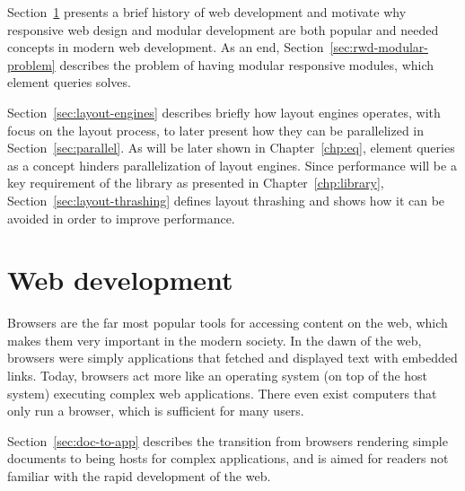 \documentclass[a4paper,11pt]{kth-mag}
\begin{document}
    Section~\ref{sec:web-dev} presents a brief history of web development and motivate why responsive web design and modular development are both popular and needed concepts in modern web development.
    As an end, Section~\ref{sec:rwd-modular-problem} describes the problem of having modular responsive modules, which element queries solves.
    
    Section~\ref{sec:layout-engines} describes briefly how layout engines operates, with focus on the layout process, to later present how they can be parallelized in Section~\ref{sec:parallel}.
    As will be later shown in Chapter~\ref{chp:eq}, element queries as a concept hinders parallelization of layout engines.
    Since performance will be a key requirement of the library as presented in Chapter~\ref{chp:library}, Section~\ref{sec:layout-thrashing} defines layout thrashing and shows how it can be avoided in order to improve performance.

    \section{Web development}\label{sec:web-dev}
      Browsers are the far most popular tools for accessing content on the \gls{web}, which makes them very important in the modern society.
      In the dawn of the \gls{web}, \glspl{browser} were simply applications that fetched and displayed text with embedded links.
      Today, \glspl{browser} act more like an operating system (on top of the host system) executing complex \gls{web} applications.
      There even exist computers that only run a \gls{browser}, which is sufficient for many users.
      
      Section~\ref{sec:doc-to-app} describes the transition from \glspl{browser} rendering simple \glspl{document} to being hosts for complex applications, and is aimed for readers not familiar with the rapid development of the \gls{web}.
\end{document}
